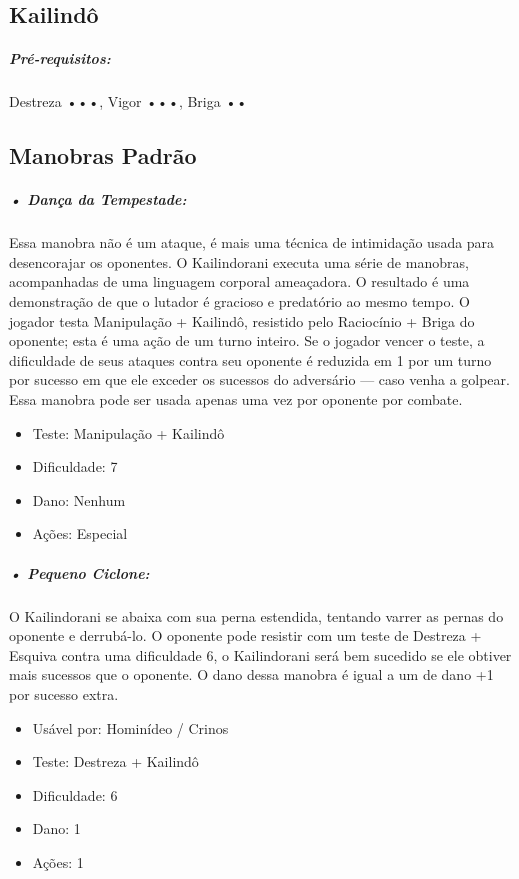 
\subsection{Kailindô}

\subparagraph*{\bf Pré-requisitos:} Destreza •••, Vigor •••, Briga ••

\subsection{\bf Manobras Padrão}

\subparagraph{\bf • Dança da Tempestade:}
Essa manobra não é um ataque, é mais uma técnica de intimidação usada para desencorajar os oponentes. O Kailindorani executa uma série de manobras, acompanhadas de uma linguagem corporal ameaçadora. O resultado é uma demonstração de que o lutador é gracioso e predatório ao mesmo tempo. O jogador testa Manipulação + Kailindô, resistido pelo Raciocínio + Briga do oponente; esta é uma ação de um turno inteiro. Se o jogador vencer o teste, a dificuldade de seus ataques contra seu oponente é reduzida em 1 por um turno por sucesso em que ele exceder os sucessos do adversário — caso venha a golpear. Essa manobra pode ser usada apenas uma vez por oponente por combate.
\begin{itemize}[noitemsep]
\item Teste: Manipulação + Kailindô 
\item Dificuldade: 7
\item Dano: Nenhum 
\item Ações: Especial
\end{itemize}

\subparagraph{\bf • Pequeno Ciclone:}
O Kailindorani se abaixa com sua perna estendida, tentando varrer as pernas do oponente e derrubá-lo. O oponente pode resistir com um teste de Destreza + Esquiva contra uma dificuldade 6, o Kailindorani será bem sucedido se ele obtiver mais sucessos que o oponente. O dano dessa manobra é igual a um de dano +1 por sucesso extra.
\begin{itemize}[noitemsep]
\item Usável por: Hominídeo / Crinos
\item Teste: Destreza + Kailindô 
\item Dificuldade: 6
\item Dano: 1 
\item Ações: 1
\end{itemize}

